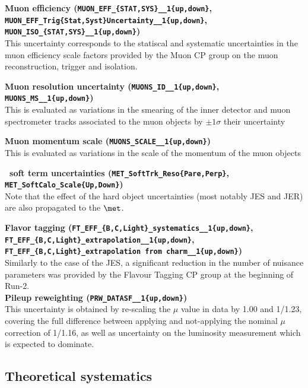 \textbf{Muon efficiency ({\tt{MUON\_EFF\_\{STAT,SYS\}\_\_1\{up,down\}}}, \\
{\tt{MUON\_EFF\_Trig\{Stat,Syst\}Uncertainty\_\_1\{up,down\}}}, \\
{\tt{MUON\_ISO\_\{STAT,SYS\}\_\_1\{up,down\}}}) }\\
This uncertainty corresponds to the statiscal and systematic uncertainties in the muon efficiency scale factors provided by the Muon CP group on the muon reconstruction, trigger and isolation.

\textbf{Muon resolution uncertainty  ({\tt{MUONS\_ID\_\_1\{up,down\}}}, {\tt{MUONS\_MS\_\_1\{up,down\}}})} \\
This is evaluated as variations in the smearing of the inner detector and muon spectrometer tracks associated to the muon objects by $\pm 1\sigma$ their uncertainty

\textbf{Muon momentum scale ({\tt{MUONS\_SCALE\_\_1\{up,down\}}})} \\
This is evaluated as variations in the scale of the momentum of the muon objects

\textbf{\met\ soft term uncertainties  ({\tt{MET\_SoftTrk\_Reso\{Pare,Perp\}}}, {\tt{MET\_SoftCalo\_Scale\{Up,Down\}}})}\\
Note that the effect of the hard object uncertainties (most notably JES and JER) are also propagated to the $\met$.

\textbf{Flavor tagging ({\tt{FT\_EFF\_\{B,C,Light\}\_systematics\_\_1\{up,down\}}}, \\
{\tt{FT\_EFF\_\{B,C,Light\}\_extrapolation\_\_1\{up,down\}}}, \\
{\tt{FT\_EFF\_\{B,C,Light\}\_extrapolation from charm\_\_1\{up,down\}}})} \\
Similarly to the case of the JES, a significant reduction in the number of nuisance parameters was provided by the Flavour Tagging CP group at the beginning of Run-2.\\

\textbf{Pileup reweighting ({\tt{PRW\_DATASF\_\_1\{up,down\}}})}\\
This uncertainty is obtained by re-scaling the $\mu$ value in data by 1.00 and 1/1.23, covering the full difference between applying and not-applying the nominal $\mu$ correction of 1/1.16, as well as uncertainty on the luminosity measurement which is expected to dominate.\\


\subsection{Theoretical systematics}
\label{sec:syst_theo}

